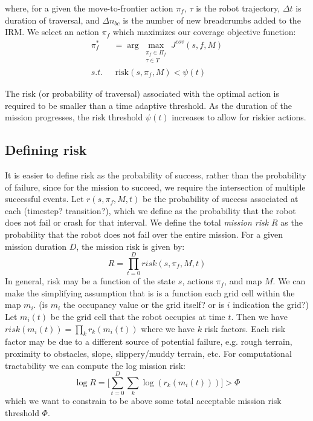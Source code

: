 \documentclass[letterpaper, 10 pt, conference]{ieeeconf}  %
\begin{document}
\noindent where, for a given the move-to-frontier action $\pi_f$, $\tau$ is the robot trajectory, $\Delta t$ is duration of traversal, and $\Delta n_{bc}$ is the number of new breadcrumbs added to the IRM. We select an action $\pi_f$ which maximizes our coverage objective function:
\begin{align}
    \pi_f^* &= \arg\max_{\substack{\pi_f\in \Pi_f \\ \tau \in T}} J^{cov}(s,f,M) \\
    s.t.~~&~\textrm{risk}(s,\pi_f,M)< \psi(t)
\end{align}

\noindent The risk (or probability of traversal) associated with the optimal action is required to be smaller than a time adaptive threshold. As the duration of the mission progresses, the risk threshold $\psi(t)$ increases to allow for riskier actions.


\subsection{Defining risk}
It is easier to define risk as the probability of success, rather than the probability of failure, since for the mission to succeed, we require the intersection of multiple successful events.  Let $r(s,\pi_f,M,t)$ be the probability of success associated at each (timestep?  transition?), which we define as the probability that the robot does not fail or crash for that interval.  We define the total \emph{mission risk} $R$ as the probability that the robot does not fail over the entire mission.  For a given mission duration $D$, the mission risk is given by:
\begin{equation}
    R= \prod_{t=0}^D risk(s,\pi_f,M,t)
\end{equation}
In general, risk may be a function of the state $s$, actions $\pi_f$, and map $M$.  We can make the simplifying assumption that is is a function each grid cell within the map $m_i$.  (is $m_i$ the occupancy value or the grid itself?  or is $i$ indication the grid?)  Let $m_i(t)$ be the grid cell that the robot occupies at time $t$.  Then we have $risk(m_i(t)) = \prod_{k} r_k(m_i(t))$ where we have $k$ risk factors.  Each risk factor may be due to a different source of potential failure, e.g. rough terrain, proximity to obstacles, slope, slippery/muddy terrain, etc.  For computational tractability we can compute the log mission risk: 
\begin{equation}
    \log R=\bigg[\sum_{t=0}^D\sum_{k} \log(r_k(m_i(t)))\bigg] > \Phi
\end{equation}
which we want to constrain to be above some total acceptable mission risk threshold $\Phi$.
\end{document}
